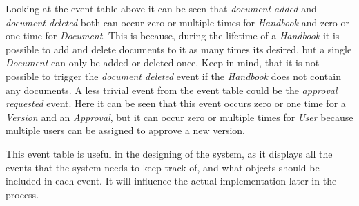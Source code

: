Looking at the event table above it can be seen that \textit{document added} and \textit{document deleted} both can occur zero or multiple times for \textit{Handbook} and zero or one time for \textit{Document}.
This is because, during the lifetime of a \textit{Handbook} it is possible to add and delete documents to it as many times its desired, but a single \textit{Document} can only be added or deleted once.
Keep in mind, that it is not possible to trigger the \textit{document deleted} event if the \textit{Handbook} does not contain any documents.
A less trivial event from the event table could be the \textit{approval requested} event.
Here it can be seen that this event occurs zero or one time for a \textit{Version} and an \textit{Approval}, but it can occur zero or multiple times for \textit{User} because multiple users can be assigned to approve a new version.

This event table is useful in the designing of the system, as it displays all the events that the system needs to keep track of, and what objects should be included in each event. It will influence the actual implementation later in the process.
